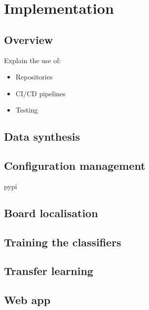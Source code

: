 \documentclass[../main.tex]{subfiles}
\begin{document}
\chapter{Implementation}

\section{Overview}

Explain the use of:
\begin{itemize}
    \item Repositories
    \item CI/CD pipelines
    \item Testing
\end{itemize}

\section{Data synthesis}
\section{Configuration management}
\gls{pypi}

\section{Board localisation}
\section{Training the classifiers}
\section{Transfer learning}
\section{Web app}
\end{document}
